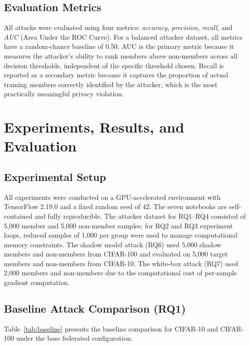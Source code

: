 \documentclass[12pt, a4paper]{report}
\begin{document}
\section{Evaluation Metrics}

All attacks were evaluated using four metrics: \textit{accuracy}, \textit{precision},
\textit{recall}, and \textit{AUC} (Area Under the ROC Curve). For a balanced
attacker dataset, all metrics have a random-chance baseline of 0.50. AUC is the
primary metric because it measures the attacker's ability to rank members above
non-members across all decision thresholds, independent of the specific threshold
chosen. Recall is reported as a secondary metric because it captures the proportion
of actual training members correctly identified by the attacker, which is the most
practically meaningful privacy violation.

\chapter{Experiments, Results, and Evaluation}

\section{Experimental Setup}

All experiments were conducted on a GPU-accelerated environment with TensorFlow
2.19.0 and a fixed random seed of 42. The seven notebooks are self-contained and
fully reproducible. The attacker dataset for RQ1--RQ4 consisted of 5,000 member
and 5,000 non-member samples; for RQ2 and RQ3 experiment loops, reduced samples
of 1,000 per group were used to manage computational memory constraints.
The shadow model attack (RQ6) used 5,000 shadow members and non-members from
CIFAR-100 and evaluated on 5,000 target members and non-members from CIFAR-10.
The white-box attack (RQ7) used 2,000 members and non-members due to the
computational cost of per-sample gradient computation.

\section{Baseline Attack Comparison (RQ1)}

Table~\ref{tab:baseline} presents the baseline comparison for CIFAR-10 and
CIFAR-100 under the base federated configuration.
\end{document}
